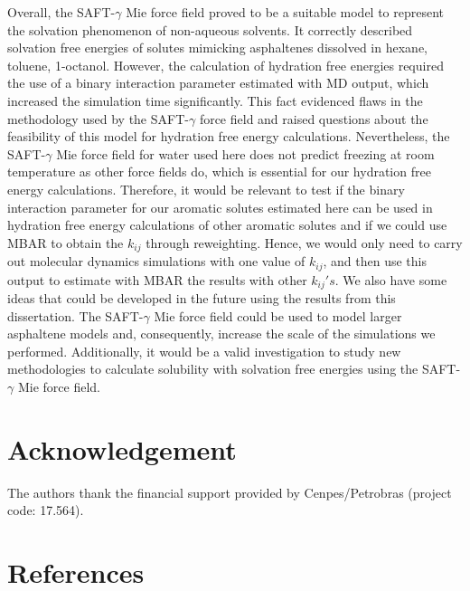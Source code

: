 \documentclass[final,12p,times,twocolumn]{elsarticle}
\begin{document}
Overall, the SAFT-$\gamma$ Mie force field proved to be a suitable model to represent the solvation phenomenon of non-aqueous solvents. It correctly described solvation free energies of solutes mimicking asphaltenes dissolved in hexane, toluene, 1-octanol. However, the calculation of hydration free energies required the use of a binary interaction parameter estimated with MD output, which increased the simulation time significantly. This fact evidenced flaws in the methodology used by the SAFT-$\gamma$ force field and raised questions about the feasibility of this model for hydration free energy calculations. Nevertheless, the SAFT-$\gamma$ Mie force field for water used here does not predict freezing at room temperature as other force fields do, which is essential for our hydration free energy calculations. Therefore, it would be relevant to test if the binary interaction parameter for our aromatic solutes estimated here can be used in hydration free energy calculations of other aromatic solutes and if we could use MBAR to obtain the $k_{ij}$ through reweighting. Hence, we would only need to carry out molecular dynamics simulations with one value of $k_{ij}$, and then use this output to estimate with MBAR the results with other $k_{ij} 's $. We also have some ideas that could be developed in the future using the results from this dissertation. The SAFT-$\gamma$ Mie force field could be used to model larger asphaltene models and, consequently, increase the scale of the simulations we performed. Additionally, it would be a valid investigation to study new methodologies to calculate solubility with solvation free energies using the SAFT-$\gamma$ Mie force field.



	
	\section{Acknowledgement}
	
	The authors thank the financial support provided by Cenpes/Petrobras (project code: 17.564). 
	
	\section*{References}
	
	
    	
	\appendix
\end{document}

